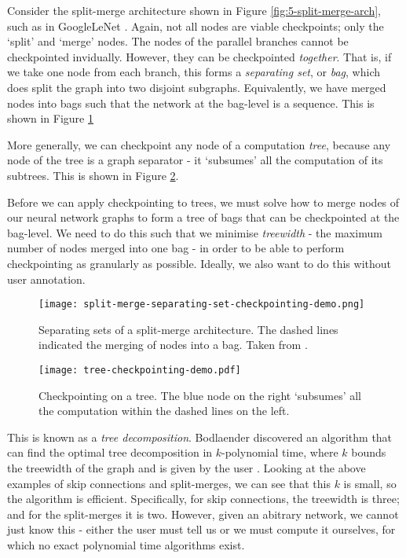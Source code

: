 Consider the split-merge architecture shown in Figure \ref{fig:5-split-merge-arch}, such as in GoogleLeNet \cite{Szegedy2015-inception}.
Again, not all nodes are viable checkpoints; only the `split' and `merge' nodes.
The nodes of the parallel branches cannot be checkpointed invidually.
However, they can be checkpointed \textit{together}.
That is, if we take one node from each branch, this forms a \textit{separating set}, or \textit{bag}, which does split the graph into two disjoint subgraphs.
Equivalently, we have merged nodes into bags such that the network at the bag-level is a sequence.
This is shown in Figure \ref{fig:5-split-merge-separating-set}

More generally, we can checkpoint any node of a computation \textit{tree}, because any node of the tree is a graph separator - it `subsumes' all the computation of its subtrees.
This is shown in Figure \ref{fig:5-tree-checkpointing}.

Before we can apply checkpointing to trees, we must solve how to merge nodes of our neural network graphs to form a tree of bags that can be checkpointed at the bag-level.
We need to do this such that we minimise \textit{treewidth} - the maximum number of nodes merged into one bag - in order to be able to perform checkpointing as granularly as possible.
Ideally, we also want to do this without user annotation.

\begin{figure}[t]
    \centering
    \texttt{[image: split-merge-separating-set-checkpointing-demo.png]}
    \caption{Separating sets of a split-merge architecture. The dashed lines indicated the merging of nodes into a bag. Taken from \cite{Bulatov-checkpointing-article}.}
    \label{fig:5-split-merge-separating-set}
\end{figure}
\begin{figure}[t]
    \centering
    \texttt{[image: tree-checkpointing-demo.pdf]}
    \caption{Checkpointing on a tree. The blue node on the right `subsumes' all the computation within the dashed lines on the left.}
    \label{fig:5-tree-checkpointing}
\end{figure}

This is known as a \textit{tree decomposition}.
Bodlaender discovered an algorithm that can find the optimal tree decomposition in \(k\)-polynomial time, where \(k\) bounds the treewidth of the graph and is given by the user \cite{Bodlaender2005}.
Looking at the above examples of skip connections and split-merges, we can see that this \(k\) is small, so the algorithm is efficient.
Specifically, for skip connections, the treewidth is three; and for the split-merges it is two.
However, given an abitrary network, we cannot just know this - either the user must tell us or we must compute it ourselves, for which no exact polynomial time algorithms exist.

